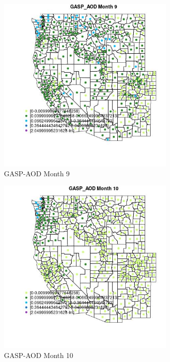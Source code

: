 \begin{figure} 
\centering  
\includegraphics[width=0.77\textwidth]{Code_Outputs/df_report_ML_predictors_CountyCentroid_Locations_Dates_2008-01-01to2018-12-31_MapObsMo9GASP_AOD.jpg} 
\caption{\label{fig:df_report_ML_predictors_CountyCentroid_Locations_Dates_2008-01-01to2018-12-31MapObsMo9GASP_AOD}GASP-AOD Month 9} 
\end{figure} 
 

\clearpage 

\begin{figure} 
\centering  
\includegraphics[width=0.77\textwidth]{Code_Outputs/df_report_ML_predictors_CountyCentroid_Locations_Dates_2008-01-01to2018-12-31_MapObsMo10GASP_AOD.jpg} 
\caption{\label{fig:df_report_ML_predictors_CountyCentroid_Locations_Dates_2008-01-01to2018-12-31MapObsMo10GASP_AOD}GASP-AOD Month 10} 
\end{figure} 
 

